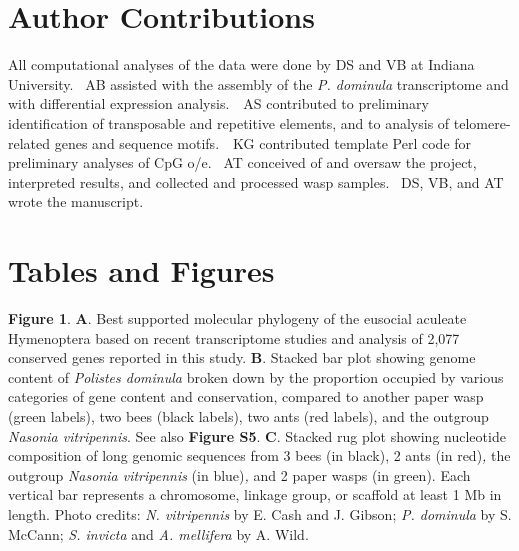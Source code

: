 \section{Author Contributions}

All computational analyses of the data were done by DS and VB at Indiana
University.~ AB assisted with the assembly of the \textit{P. dominula}
transcriptome and with differential expression analysis.~~AS contributed
to preliminary identification of transposable and repetitive elements,
and to analysis of telomere-related genes and sequence motifs.~~KG
contributed template Perl code for preliminary analyses of CpG o/e.~ AT
conceived of and oversaw the project, interpreted results, and collected
and processed wasp samples.~ DS, VB, and AT wrote the manuscript.

\section{Tables and Figures}

\textbf{Figure 1}. \textbf{A}. Best supported molecular phylogeny of the
eusocial aculeate Hymenoptera based on recent transcriptome studies and
analysis of 2,077 conserved genes reported in this study. \textbf{B}.
Stacked bar plot showing genome content of \textit{Polistes dominula}
broken down by the proportion occupied by various categories of gene
content and conservation, compared to another paper wasp (green labels),
two bees (black labels), two ants (red labels), and the outgroup
\textit{Nasonia vitripennis}. See also \textbf{Figure S5}. \textbf{C}.
Stacked rug plot showing nucleotide composition of long genomic
sequences from 3 bees (in black), 2 ants (in red)\textit{,} the outgroup
\textit{Nasonia vitripennis} (in blue)\textit{,} and 2 paper wasps (in
green). Each vertical bar represents a chromosome, linkage group, or
scaffold at least 1 Mb in length. Photo credits: \textit{N. vitripennis}
by E. Cash and J. Gibson; \textit{P. dominula} by S. McCann; \textit{S.
invicta} and \textit{A. mellifera} by A. Wild.

